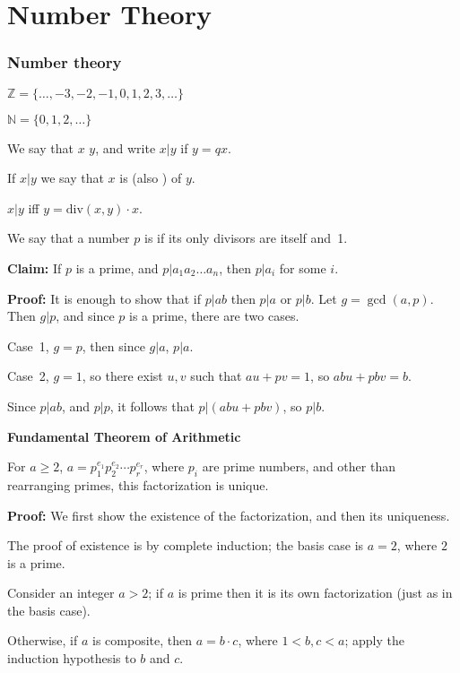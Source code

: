 
\newcommand{\mytitle}{Mathematical Foundations}
\newcommand{\mychpnr}{9}


\section{Number Theory}

\begin{frame}
\frametitle{Number theory}

$\mathbb{Z}=\{\ldots,-3,-2,-1,0,1,2,3,\ldots\}$

$\mathbb{N}=\{0,1,2,\ldots\}$  

We say that $x$ 
$y$, and write $x|y$ if $y=qx$.  

If $x|y$ we
say that $x$ is  (also ) of $y$.

$x|y$ iff
$y=\text{div}(x,y)\cdot x$.  

We say that a number $p$ is  if its only divisors are itself
and~1.
\end{frame}

\begin{frame}

{\bf Claim:}
If $p$ is a prime, and $p|a_1a_2\ldots a_n$, then $p|a_i$ for some
$i$.

{\bf Proof:}
It is enough to show that if $p|ab$ then $p|a$ or $p|b$.  Let
$g=\gcd(a,p)$.  Then $g|p$, and since $p$ is a prime, there are two
cases.  

Case~1, $g=p$, then since $g|a$, $p|a$.  

Case~2, $g=1$, so
there exist $u,v$ such that $au+pv=1$,
so $abu+pbv=b$.  

Since $p|ab$, and
$p|p$, it follows that $p|(abu+pbv)$, so $p|b$.
\end{frame}

\begin{frame}

{\bf Fundamental Theorem of Arithmetic}

For $a\ge 2$, $a=p_1^{e_1}p_2^{e_2}\cdots p_r^{e_r}$, where $p_i$ are
prime numbers, and other than rearranging primes, this factorization
is unique.

{\bf Proof:}
We first show the existence of the factorization, and then its
uniqueness.  

The proof of existence is by complete induction; the
basis case is $a=2$, where $2$ is a prime.  

Consider an integer $a>2$;
if $a$ is prime then it is its own factorization (just as in the basis
case).  

Otherwise, if $a$ is composite, then $a=b\cdot c$, where
$1<b,c<a$; apply the induction hypothesis to $b$ and $c$.  

\end{frame}

